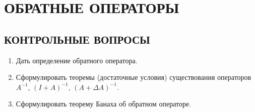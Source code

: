 \documentclass[12pt,a4paper]{article}
\begin{document}
\section{ОБРАТНЫЕ ОПЕРАТОРЫ}

\subsection*{КОНТРОЛЬНЫЕ ВОПРОСЫ}
\begin{enumerate}
\item Дать определение обратного оператора.
\item Сформулировать теоремы (достаточные условия) существования операторов $A^{-1}$, $(I+A)^{-1}$, $(A+\Delta A)^{-1}$.
\item Сформулировать теорему Банаха об обратном операторе.
\end{enumerate}
\end{document}
